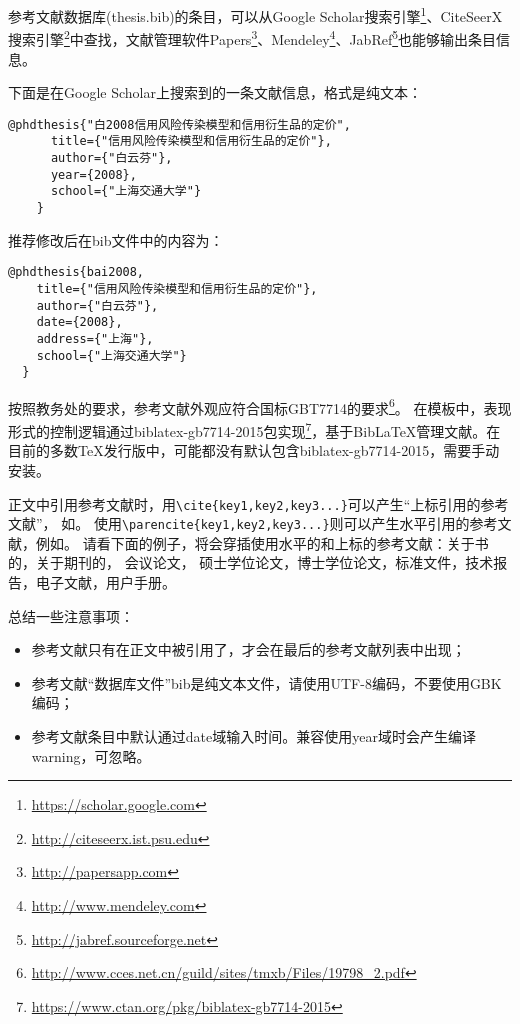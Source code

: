 参考文献数据库(thesis.bib)的条目，可以从Google Scholar搜索引擎\footnote{\url{https://scholar.google.com}}、CiteSeerX搜索引擎\footnote{\url{http://citeseerx.ist.psu.edu}}中查找，文献管理软件Papers\footnote{\url{http://papersapp.com}}、Mendeley\footnote{\url{http://www.mendeley.com}}、JabRef\footnote{\url{http://jabref.sourceforge.net}}也能够输出条目信息。

下面是在Google Scholar上搜索到的一条文献信息，格式是纯文本：

\begin{lstlisting}[caption={从Google Scholar找到的参考文献条目}, label=googlescholar, escapeinside="", numbers=none]
    @phdthesis{"白2008信用风险传染模型和信用衍生品的定价",
      title={"信用风险传染模型和信用衍生品的定价"},
      author={"白云芬"},
      year={2008},
      school={"上海交通大学"}
    } 
\end{lstlisting}

推荐修改后在bib文件中的内容为：

\begin{lstlisting}[caption={修改后的参考文献条目}, label=itemok, escapeinside="", numbers=none]
  @phdthesis{bai2008,
    title={"信用风险传染模型和信用衍生品的定价"},
    author={"白云芬"},
    date={2008},
    address={"上海"},
    school={"上海交通大学"}
  } 
\end{lstlisting}

按照教务处的要求，参考文献外观应符合国标GBT7714的要求\footnote{\url{http://www.cces.net.cn/guild/sites/tmxb/Files/19798_2.pdf}}。
在模板中，表现形式的控制逻辑通过bibla­tex-gb7714-2015包实现\footnote{\url{https://www.ctan.org/pkg/biblatex-gb7714-2015}}，基于{Bib\LaTeX}管理文献。在目前的多数TeX发行版中，可能都没有默认包含biblatex-gb7714-2015，需要手动安装。

正文中引用参考文献时，用\verb+\cite{key1,key2,key3...}+可以产生“上标引用的参考文献”，
如\cite{Meta_CN,chen2007act,DPMG}。
使用\verb+\parencite{key1,key2,key3...}+则可以产生水平引用的参考文献，例如\parencite{JohnD,zhubajie,IEEE-1363}。
请看下面的例子，将会穿插使用水平的和上标的参考文献：关于书的\parencite{Meta_CN,JohnD,IEEE-1363}，关于期刊的\cite{chen2007act,chen2007ewi}，
会议论文\parencite{DPMG,kocher99,cnproceed}，
硕士学位论文\parencite{zhubajie,metamori2004}，博士学位论文\cite{shaheshang,FistSystem01,bai2008}，标准文件\parencite{IEEE-1363}，技术报告\cite{NPB2}，电子文献\parencite{xiaoyu2001, CHRISTINE1998}，用户手册\parencite{RManual}。

总结一些注意事项：
\begin{itemize}
\item 参考文献只有在正文中被引用了，才会在最后的参考文献列表中出现；
\item 参考文献“数据库文件”bib是纯文本文件，请使用UTF-8编码，不要使用GBK编码；
\item 参考文献条目中默认通过date域输入时间。兼容使用year域时会产生编译warning，可忽略。
\end{itemize}

